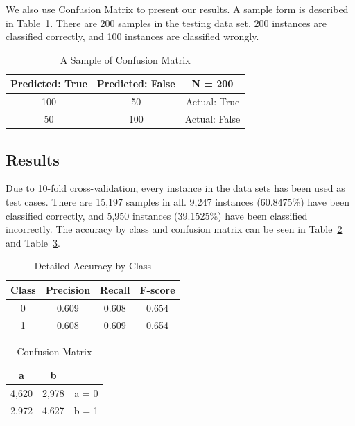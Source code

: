 \documentclass{article}
\begin{document}
We also use Confusion Matrix to present our results. A sample form is described in Table~\ref{table:sample}. There are 200 samples in the testing data set. 200 instances are classified correctly, and 100 instances are classified wrongly.

\begin{table}
\begin{center}
\begin{tabular}{|c|c|c|}
\hline
Predicted: True & Predicted: False & N = 200 \\ \hline
100 & 50 & Actual: True \\ \hline
50 & 100 & Actual: False \\ \hline
\end{tabular}
\caption{A Sample of Confusion Matrix}
\label{table:sample}
\end{center}
\end{table}

\subsection{Results}
Due to 10-fold cross-validation, every instance in the data sets has been used as test cases. There are 15,197 samples in all. 9,247 instances (60.8475\%) have been classified correctly, and 5,950 instances (39.1525\%) have been classified incorrectly. The accuracy by class and confusion matrix can be seen in Table~\ref{table:accuracy} and Table~\ref{table:matrix}.

\begin{table}
\begin{center}
\begin{tabular}{|c|c|c|c|}
\hline
Class & Precision & Recall & F-score \\ \hline
0 & 0.609 & 0.608 & 0.654 \\ \hline
1 & 0.608 & 0.609 & 0.654 \\ \hline
\end{tabular}
\caption{Detailed Accuracy by Class}
\label{table:accuracy}
\end{center}
\end{table}

\begin{table}
\begin{center}
\begin{tabular}{|c|c|c|}
\hline
a & b & \\ \hline
4,620 & 2,978 & a = 0 \\ \hline
2,972 & 4,627 & b = 1 \\ \hline
\end{tabular}
\caption{Confusion Matrix}
\label{table:matrix}
\end{center}
\end{table}
\end{document}

